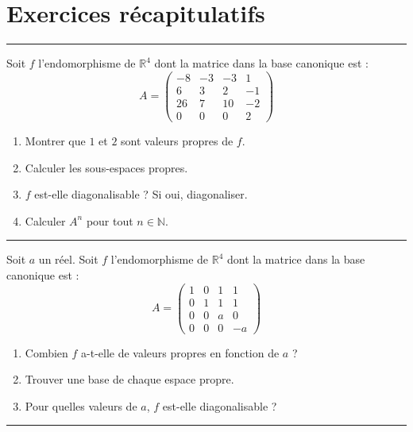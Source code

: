 \documentclass[../PolyS4.tex]{subfiles}
\begin{document}
\section{Exercices récapitulatifs}

\vspace{1em}
\hrule
\vspace{1em}


Soit $f$ l'endomorphisme de $\mathbb{R}^4$ dont la matrice dans la base canonique est :
$$A = \begin{pmatrix}
-8 & -3 & -3 & 1 \\
6 & 3 & 2 & -1 \\
26 & 7 & 10 & -2 \\
0 & 0 & 0 & 2
\end{pmatrix}$$
\begin{enumerate}
    \item Montrer que $1$ et $2$ sont valeurs propres de $f$.
    \item Calculer les sous-espaces propres.
    \item $f$ est-elle diagonalisable ? Si oui, diagonaliser.
    \item Calculer $A^n$ pour tout $n \in \mathbb{N}$.
\end{enumerate}

\vspace{1em}
\hrule
\vspace{1em}


Soit $a$ un réel. Soit $f$ l'endomorphisme de $\mathbb{R}^4$ dont la matrice dans la base canonique est :
$$A = \begin{pmatrix}
1 & 0 & 1 & 1 \\
0 & 1 & 1 & 1 \\
0 & 0 & a & 0 \\
0 & 0 & 0 & -a
\end{pmatrix}$$
\begin{enumerate}
    \item Combien $f$ a-t-elle de valeurs propres en fonction de $a$ ?
    \item Trouver une base de chaque espace propre.
    \item Pour quelles valeurs de $a$, $f$ est-elle diagonalisable ?
\end{enumerate}

\vspace{1em}
\hrule
\vspace{1em}
\end{document}
